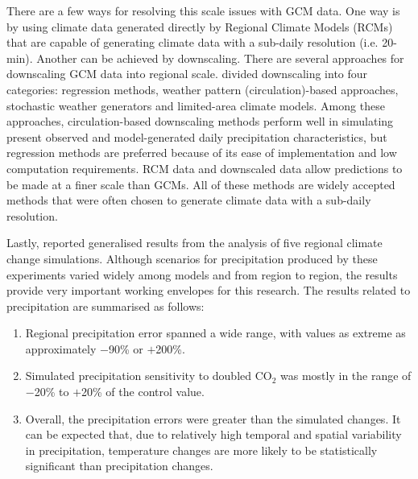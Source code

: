 There are a few ways for resolving this scale issues with GCM data. One way is
by using climate data generated directly by Regional Climate Models (RCMs) that
are capable of generating climate data with a sub-daily resolution (i.e.
20-min). Another can be achieved by downscaling. There are several approaches
for downscaling GCM data into regional scale. \citet{wilby1997-530} divided
downscaling into four categories: regression methods, weather pattern
(circulation)-based approaches, stochastic weather generators and limited-area
climate models. Among these approaches, circulation-based downscaling methods
perform well in simulating present observed and model-generated daily
precipitation characteristics, but regression methods are preferred because of
its ease of implementation and low computation requirements. RCM data and
downscaled data allow predictions to be made at a finer scale than GCMs. All of
these methods are widely accepted methods that were often chosen to generate
climate data with a sub-daily resolution.

Lastly, \citet{ipcc2001-1032} reported generalised results from the analysis
of five regional climate change simulations. Although scenarios for
precipitation produced by these experiments varied widely among models and from
region to region, the results provide very important working envelopes for this
research. The results related to precipitation are summarised as follows:
\begin{enumerate}
  \item Regional precipitation error spanned a wide range, with values as
extreme as approximately $-$90\% or $+$200\%.
  \item Simulated precipitation sensitivity to doubled CO$_2$ was mostly
in the range of $-$20\% to $+$20\% of the control value.
  \item Overall, the precipitation errors were greater than the simulated
changes. It can be expected that, due to relatively high temporal and spatial
variability in precipitation, temperature changes are more likely to be
statistically significant than precipitation changes.
\end{enumerate}
